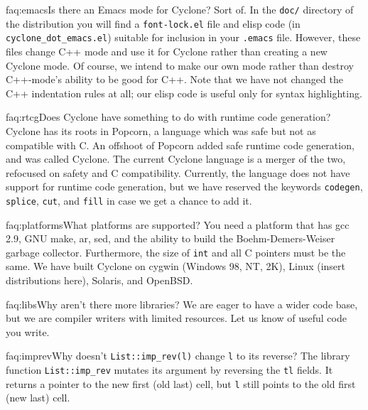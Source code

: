 \begin{faqa}{faq:emacs}{Is there an Emacs mode for Cyclone?}
Sort of.  In the \texttt{doc/} directory of the distribution you will
find a \texttt{font-lock.el} file and elisp code (in
\texttt{cyclone_dot_emacs.el}) suitable for inclusion in your
\texttt{.emacs} file.  However, these files change C++ mode and use it
for Cyclone rather than creating a new Cyclone mode.  Of course, we
intend to make our own mode rather than destroy C++-mode's ability to
be good for C++.  Note that we have not changed the C++ indentation
rules at all; our elisp code is useful only for syntax highlighting.
\end{faqa}

\begin{faqa}{faq:rtcg}{Does Cyclone have something to do with runtime code generation?}
Cyclone has its roots in Popcorn, a language which was safe but not as
compatible with C\@.  An offshoot of Popcorn added safe runtime code
generation, and was called Cyclone.  The current Cyclone language is a
merger of the two, refocused on safety and C compatibility.
Currently, the language does not have support for runtime code
generation, but we have reserved the keywords \texttt{codegen},
\texttt{splice}, \texttt{cut}, and \texttt{fill} in case we get a
chance to add it.
\end{faqa}

\begin{faqa}{faq:platforms}{What platforms are supported?}
You need a platform that has gcc 2.9, GNU make, ar, sed, and the
ability to build the Boehm-Demers-Weiser garbage collector.
Furthermore, the size of \texttt{int} and all C pointers must be the
same.  We have built Cyclone on cygwin (Windows 98, NT, 2K), Linux
(insert distributions here), Solaris, and OpenBSD.
\end{faqa}

\begin{faqa}{faq:libs}{Why aren't there more libraries?}
We are eager to have a wider code base, but we are compiler writers
with limited resources.  Let us know of useful code you write.
\end{faqa}

\begin{faqa}{faq:imprev}{Why doesn't \texttt{List::imp_rev(l)} change \texttt{l} to its reverse?} 
The library function \texttt{List::imp_rev} mutates its argument by
reversing the \texttt{tl} fields.  It returns a pointer to the new
first (old last) cell, but \texttt{l} still points to the old first
(new last) cell.
\end{faqa}

